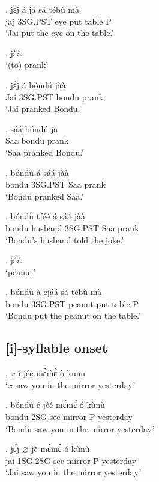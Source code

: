 \documentclass{assets/fieldnotes}
\begin{document}
\exg. jɛ̀j á já sá tébù mà \\
jaj 3SG.PST eye put table P \\
`Jai put the eye on the table.'

\ex. jàà \\
`(to) prank'

\exg. jɛ́j á bóndú jàà \\
Jai 3SG.PST bondu prank \\
`Jai pranked Bondu.'


\exg. sáá bóndú jà \\
Saa bondu prank \\
`Saa pranked Bondu.'

\exg. bóndú á sáá jàà \\
bondu 3SG.PST Saa prank \\
`Bondu pranked Saa.'

\exg. bóndù tʃéé á sáá jàà \\
bondu husband 3SG.PST Saa prank \\
`Bondu's husband told the joke.'

\ex. jáá \\
`peanut'


\exg. bóndú à ejáá sá tébù mà \\
bondu 3SG.PST peanut put table P \\
`Bondu put the peanut on the table.'


\subsection{[i]-syllable onset}


\ex. $x$ í jéé mɛ̀m̀ɛ̀ ò kunu \\
`$x$ saw you in the mirror yesterday.'

\exg. bóndú é jẽ́ẽ́ mɛ́mɛ́ ó kùnù \\
bondu 2SG see mirror P yesterday \\
`Bondu saw you in the mirror yesterday.'


\exg. jɛ́j $\varnothing$ jẽ̀ mɛ̀mɛ̀ ó kùnù \\
jai 1SG.2SG see mirror P yesterday \\
`Jai saw you in the mirror yesterday.'
\end{document}
